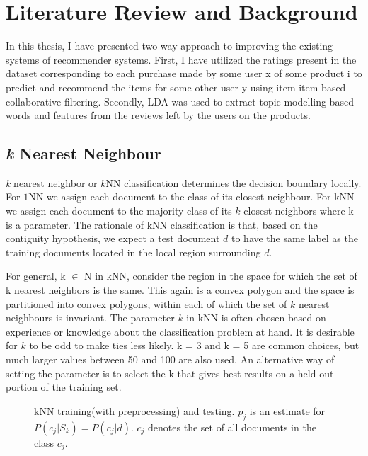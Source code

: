 \chapter{Literature Review and Background}
In this thesis, I have presented two way approach to improving the existing systems of recommender systems.
First, I have utilized the ratings present in the dataset corresponding to each purchase made by some user x of some product i to predict and recommend the items for some other user y using item-item based collaborative filtering. Secondly, LDA was used to extract topic modelling based words and features from the reviews left by the users on the products.

\section{\textit{k} Nearest Neighbour}
\textit{k} nearest neighbor or $k$NN classification determines the decision boundary locally. For $1$NN we assign each document to the class of its closest neighbour. For kNN we assign each document to the majority class of its $k$ closest neighbors where k is a parameter. The rationale of kNN classification is that, based on the contiguity hypothesis, we expect a test document $d$ to have the same label as the training documents located in the local region surrounding $d$.

For general, k $\in$ N in kNN, consider the region in the space for which the set of k nearest neighbors is the same. This again is a convex polygon and the space is partitioned into convex polygons, within each of which the set of $k$ nearest neighbours is invariant.
The parameter $k$ in kNN is often chosen based on experience or knowledge about the classification problem at hand.  It is desirable for $k$ to be odd to make ties less likely. k = 3 and k = 5 are common choices, but much larger values between 50 and 100 are also used.  An alternative way of setting the parameter is to select the k that gives best results on a held-out portion of the training set.
\begin{figure}[H]
    {\par}
    \caption{kNN  training(with preprocessing) and testing. $p_{j}$ is an estimate for $P(c_{j}|S_{k}) = P(c_{j}|d)$. $c_{j}$ denotes the set of all documents in the class $c_{j}$.}
\end{figure}

